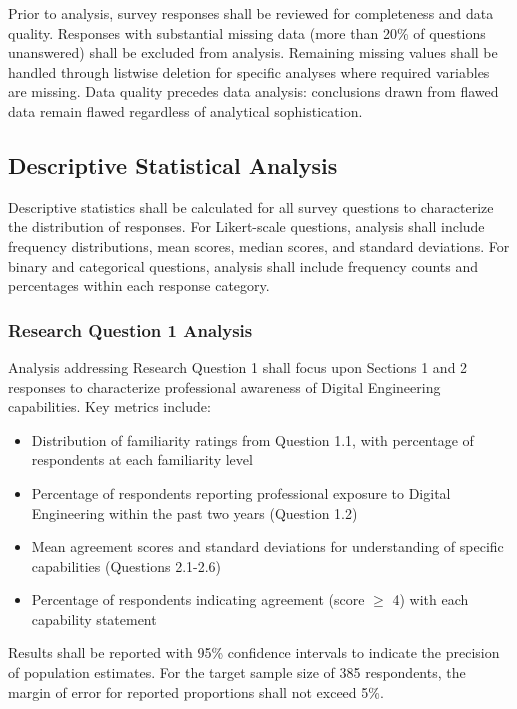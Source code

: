 Prior to analysis, survey responses shall be reviewed for completeness and data quality. Responses with substantial missing data (more than 20\% of questions unanswered) shall be excluded from analysis. Remaining missing values shall be handled through listwise deletion for specific analyses where required variables are missing. Data quality precedes data analysis: conclusions drawn from flawed data remain flawed regardless of analytical sophistication.

\subsection{Descriptive Statistical Analysis}

Descriptive statistics shall be calculated for all survey questions to characterize the distribution of responses. For Likert-scale questions, analysis shall include frequency distributions, mean scores, median scores, and standard deviations. For binary and categorical questions, analysis shall include frequency counts and percentages within each response category.

\subsubsection{Research Question 1 Analysis}

Analysis addressing Research Question 1 shall focus upon Sections 1 and 2 responses to characterize professional awareness of Digital Engineering capabilities. Key metrics include:

\begin{itemize}
  \item Distribution of familiarity ratings from Question 1.1, with percentage of respondents at each familiarity level
  \item Percentage of respondents reporting professional exposure to Digital Engineering within the past two years (Question 1.2)
  \item Mean agreement scores and standard deviations for understanding of specific capabilities (Questions 2.1-2.6)
  \item Percentage of respondents indicating agreement (score \(\geq\) 4) with each capability statement
\end{itemize}

Results shall be reported with 95\% confidence intervals to indicate the precision of population estimates. For the target sample size of 385 respondents, the margin of error for reported proportions shall not exceed 5\%.

